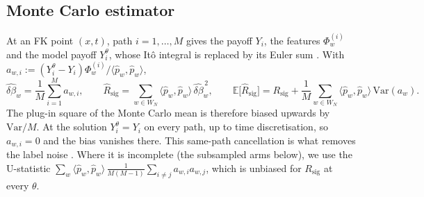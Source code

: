 \documentclass[english]{article}
\begin{document}
\subsection{Monte Carlo estimator}\label{sec:estimator}
At an FK point $(x,t)$, path $i=1,\dots,M$ gives the payoff $Y_i$, the features $\Phi^{(i)}_w$ and the model payoff $Y^\theta_i$, whose It\^o integral is replaced by its Euler sum \cite{kloeden1992numerical}. With $a_{w,i} := (Y^\theta_i - Y_i)\Phi^{(i)}_w/\langle\hat p_w,\hat p_w\rangle$,
\begin{equation}\label{eq:est}
  \widehat{\delta\beta}_w = \frac1M\sum_{i=1}^M a_{w,i},
  \qquad
  \hat R_\mathrm{sig} = \sum_{w\in W_N}\langle\hat p_w,\hat p_w\rangle\,\widehat{\delta\beta}_w^{\,2},
  \qquad
  \mathbb E\big[\hat R_\mathrm{sig}\big] = R_\mathrm{sig} + \frac1M\sum_{w\in W_N}\langle\hat p_w,\hat p_w\rangle\,\mathrm{Var}(a_w).
\end{equation}
The plug-in square of the Monte Carlo mean is therefore biased upwards by $\mathrm{Var}/M$. At the solution $Y^\theta_i = Y_i$ on every path, up to time discretisation, so $a_{w,i}=0$ and the bias vanishes there. This same-path cancellation is what removes the label noise \cite{newton1994variance}. Where it is incomplete (the subsampled arms below), we use the U-statistic \cite{hoeffding1948class} $\sum_w\langle\hat p_w,\hat p_w\rangle\,\frac{1}{M(M-1)}\sum_{i\neq j}a_{w,i}a_{w,j}$, which is unbiased for $R_\mathrm{sig}$ at every $\theta$.
\end{document}
